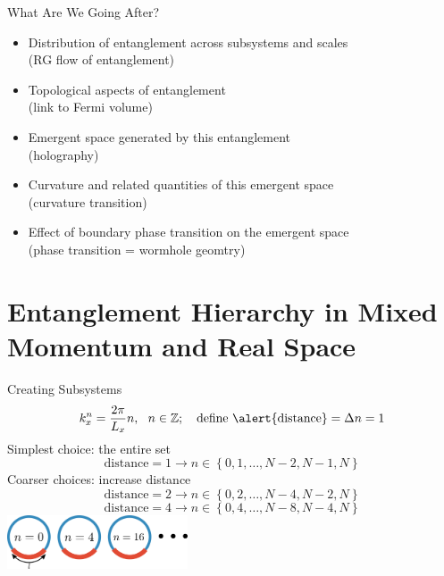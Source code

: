 \documentclass[12pt,aspectratio=169]{beamer}
\begin{document}
\begin{frame}{What Are We Going After?}
	\begin{itemize}
		\item Distribution of entanglement across subsystems and scales\\ (\alert{RG flow of entanglement})\\[10pt]
		\item Topological aspects of entanglement\\ (\alert{link to Fermi volume})\\[10pt]
		\item Emergent space generated by this entanglement\\ (\alert{holography})\\[10pt]
		\item Curvature and related quantities of this emergent space\\ (\alert{curvature transition})\\[10pt]
		\item Effect of boundary phase transition on the emergent space\\ (\alert{phase transition = wormhole geomtry})
	\end{itemize}

\end{frame}

\section{Entanglement Hierarchy in Mixed Momentum and Real Space}

\begin{frame}{Creating Subsystems}
	\[k_x^n = \frac{2\pi }{L_x} n,~ ~ n \in \mathbb{Z};~~~ \text{define \alert{distance}} = \Delta n = 1\]
	\alert{Simplest} choice: the entire set
	\[\text{distance} = 1 \longrightarrow n \in \left\{0,1,\ldots,N-2,N-1,N\right\} \]
	\alert{Coarser} choices: increase distance
	\[\text{distance} = 2 \longrightarrow n \in \left\{0,2,\ldots,N-4,N-2,N\right\} \]
	\[\text{distance} = 4 \longrightarrow n \in \left\{0,4,\ldots,N-8,N-4,N\right\} \]
	\centering
	\vspace*{\fill}
	\includegraphics[width=0.4\textwidth]{figures/A_mi.pdf}
\end{frame}
\end{document}
